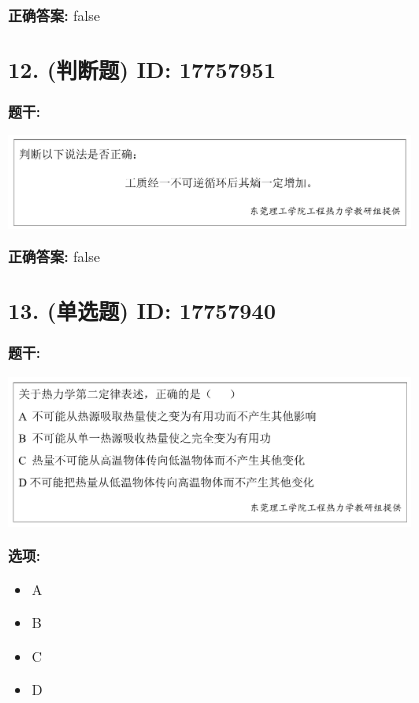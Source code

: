 \documentclass[12pt]{article}
\begin{document}
\textbf{正确答案:}
false

\vspace{0.5em}\hrulefill\vspace{1em}

\subsection*{12. (判断题) \small ID: 17757951}

\textbf{题干:}


\begin{center}\includegraphics[width=0.8\textwidth, height=0.25\textheight, keepaspectratio]{question_12_17757951/title_img_1.png}\end{center}

\textbf{正确答案:}
false

\vspace{0.5em}\hrulefill\vspace{1em}

\subsection*{13. (单选题) \small ID: 17757940}

\textbf{题干:}


\begin{center}\includegraphics[width=0.8\textwidth, height=0.25\textheight, keepaspectratio]{question_13_17757940/title_img_1.png}\end{center}

\textbf{选项:}
\begin{itemize}[leftmargin=*]
  \item A

  \item B

  \item C

  \item D

\end{itemize}
\end{document}
